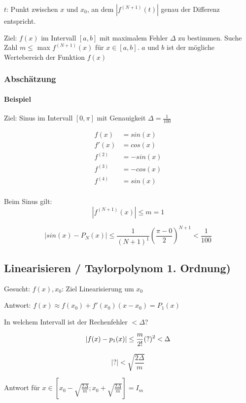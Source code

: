 $t$: Punkt zwischen $x$ und $x_0$, an dem $\left| f^{(N+1)}(t) \right|$ genau der Differenz entspricht.

Ziel: $f(x)$ im Intervall $[a,b]$ mit maximalem Fehler $\Delta$ zu bestimmen.
Suche Zahl $m \leq$ max $f^{(N+1)}(x)$ für $x \in [a,b]$. $a$ und $b$ ist der mögliche Wertebereich der Funktion $f(x)$

\subsubsection{Abschätzung}



\paragraph{Beispiel}

Ziel: Sinus im Intervall $[0, \pi]$ mit Genauigkeit $\Delta = \frac{1}{100}$

\begin{align*}
	f(x) &= sin(x) \\
	f'(x) &= cos(x) \\
	f^{(2)} &= -sin(x) \\
	f^{(3)} &= -cos(x) \\
	f^{(4)} &= sin(x) \\
\end{align*}

Beim Sinus gilt:
\[
	\left| f^{(N+1)}(x) \right| \leq m = 1
\]

\[
	\left| sin(x) - P_N(x) \right| \leq \frac{1}{(N+1)^1} \left(\frac{\pi-0}{2}\right)^{N+1} < \frac{1}{100}
\]

\subsection{Linearisieren / Taylorpolynom 1. Ordnung)}
Gesucht: $f(x), x_0$: Ziel Linearisierung um $x_0$

Antwort: $f(x) \approx f(x_0) + f'(x_0)(x-x_0) = P_1(x)$

In welchem Intervall ist der Rechenfehler $< \Delta$?

\[
	\left|f(x) - p_1(x) \right| \leq \frac{m}{2!}(?)^2 < \Delta \\
\]

\[
	|?| < \sqrt{\frac{2 \Delta}{m}}
\]

Antwort für $x \in \left[ x_0 - \sqrt{\frac{2 \Delta}{m}}; x_0 + \sqrt{\frac{2 \Delta}{m}} \right] = I_m$


